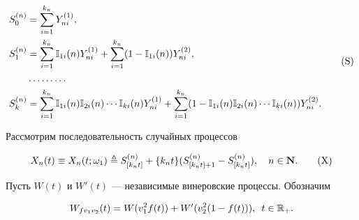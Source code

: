 \begin{equation}


\begin{split}


S_0^{(n)}&=\sum_{i=1}^{k_n}Y_{ni}^{(1)},\\


%


S_1^{(n)}&=\sum_{i=1}^{k_n}\IND_{1i}(n)Y_{ni}^{(1)}+


\sum_{i=1}^{k_n}(1-\IND_{1i}(n))Y^{(2)}_{ni}, \\


%


&\dotsc\dotsc\dotsc \\


%


S_{k}^{(n)}&=\sum_{i=1}^{k_n}\IND_{1i}(n)\IND_{2i}(n)\dotsb


\IND_{ki}(n)Y_{ni}^{(1)}+


\sum_{i=1}^{k_n}(1-\IND_{1i}(n)\IND_{2i}(n)\dotsb


\IND_{ki}(n))Y^{(2)}_{ni}.


\end{split}


\tag{$\mathrm S$}


\end{equation}


\medskip





Рассмотрим последовательность случайных процессов


\begin{equation}


X_{n}(t)\equiv X_{n}(t;\omega_1)


\triangleq S^{(n)}_{[k_nt]}+\{k_nt\}( S^{(n)}_{[k_nt]+1} -


S^{(n)}_{[k_nt]}),\quad n\in\N.


\tag{$\mathrm X$}


\end{equation}





Пусть $W(t)$ и $W'(t)$ --- независимые винеровские процессы. Обозначим


$$


W_{fv_1v_2}(t)=W(v_1^2f(t))+W'(v_2^2(1-f(t))),\,\,\, t \in \Bbb R_+.


$$








